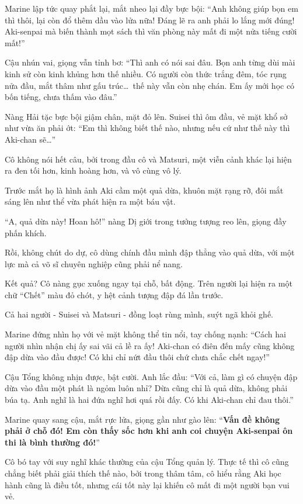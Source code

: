\documentclass[../main.tex]{subfiles}
\begin{document}
Marine lập tức quay phắt lại, mắt nheo lại đầy bực bội: ``Anh không giúp bọn em thì thôi, lại còn đổ thêm dầu vào lửa nữa! Đáng lẽ ra anh phải lo lắng mới đúng! Aki-senpai mà biến thành mọt sách thì văn phòng này mất đi một nửa tiếng cười mất!''

Cậu nhún vai, giọng vẫn tỉnh bơ: ``Thì anh có nói sai đâu. Bọn anh từng dùi mài kinh sử còn kinh khủng hơn thế nhiều. Có người còn thức trắng đêm, tóc rụng nửa đầu, mắt thâm như gấu trúc\dots\ thế này vẫn còn nhẹ chán. Em ấy mới học có bốn tiếng, chưa thấm vào đâu.''

Nàng Hải tặc bực bội giậm chân, mặt đỏ lên. Suisei thì ôm đầu, vẻ mặt khổ sở như vừa ăn phải ớt: ``Em thì không biết thế nào, nhưng nếu cứ như thế này thì Aki-chan sẽ\dots''

Cô không nói hết câu, bởi trong đầu cô và Matsuri, một viễn cảnh khác lại hiện ra đen tối hơn, kinh hoàng hơn, và vô cùng vô lý.


Trước mắt họ là hình ảnh Aki cầm một quả dừa, khuôn mặt rạng rỡ, đôi mắt sáng lên như thể vừa phát hiện ra một báu vật.

``A, quả dừa này! Hoan hô!'' nàng Dị giới trong tưởng tượng reo lên, giọng đầy phấn khích.

Rồi, không chút do dự, cô dùng chính đầu mình đập thẳng vào quả dừa, với một lực mà cả võ sĩ chuyên nghiệp cũng phải nể nang.

Kết quả? Cô nàng gục xuống ngay tại chỗ, bất động. Trên người lại hiện ra một chữ ``Chết'' màu đỏ chót, y hệt cảnh tượng đập đá lần trước.

Cả hai người - Suisei và Matsuri - đồng loạt rùng mình, suýt ngã khỏi ghế.

Marine đứng nhìn họ với vẻ mặt không thể tin nổi, tay chống nạnh: ``Cách hai người nhìn nhận chị ấy sai vãi cả lề ra ấy! Aki-chan có điên đến mấy cũng không đập dừa vào đầu được! Có khi chỉ nứt đầu thôi chứ chưa chắc chết ngay!''

Cậu Tổng không nhịn được, bật cười. Anh lắc đầu: ``Với cả, làm gì có chuyện đập dừa vào đầu một phát là ngỏm luôn nhỉ? Dừa cũng chỉ là quả dừa, không phải búa tạ. Anh nghĩ là hai đứa nghĩ hơi quá rồi đấy. Có khi Aki-chan chỉ đau thôi.''

Marine quay sang cậu, mắt rực lửa, giọng gần như gào lên: ``\textbf{Vấn đề không phải ở chỗ đó! Em còn thấy sốc hơn khi anh coi chuyện Aki-senpai ôn thi là bình thường đó!}''

Cô bó tay với suy nghĩ khác thường của cậu Tổng quản lý. Thực tế thì cô cũng chẳng biết phải giải thích thế nào, bởi trong thâm tâm, cô hiểu rằng Aki học hành cũng là điều tốt, nhưng cái tốt này lại khiến cô mất đi một người bạn vui vẻ.
\end{document}

